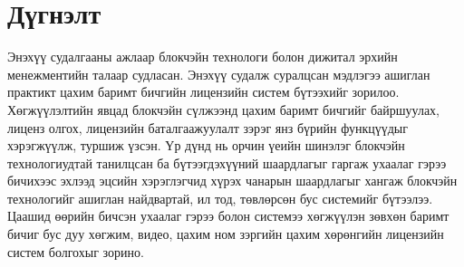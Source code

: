 \chapter{Дүгнэлт}
Энэхүү судалгааны ажлаар блокчэйн технологи болон дижитал эрхийн менежментийн талаар судласан. Энэхүү судалж суралцсан мэдлэгээ ашиглан практикт цахим баримт бичгийн лицензийн систем бүтээхийг зорилоо. Хөгжүүлэлтийн явцад блокчэйн сүлжээнд цахим баримт бичгийг байршуулах, лиценз олгох, лицензийн баталгаажуулалт зэрэг янз бүрийн функцүүдыг хэрэгжүүлж, туршиж үзсэн.
Үр дүнд нь орчин үеийн шинэлэг блокчэйн технологиудтай танилцсан ба бүтээгдэхүүний шаардлагыг гаргаж ухаалаг гэрээ бичихээс эхлээд эцсийн хэрэглэгчид хүрэх чанарын шаардлагыг хангаж блокчэйн технологийг ашиглан найдвартай, ил тод, төвлөрсөн бус системийг бүтээлээ. Цаашид өөрийн бичсэн ухаалаг гэрээ болон системээ хөгжүүлэн зөвхөн баримт бичиг бус дуу хөгжим, видео, цахим ном зэргийн цахим хөрөнгийн лицензийн систем болгохыг зорино.